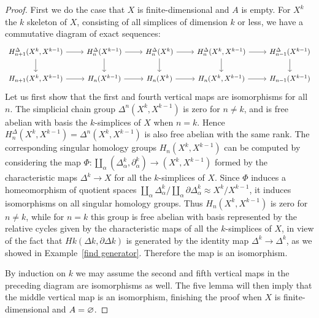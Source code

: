 \begin{proof}
First we do the case that $X$ is finite-dimensional and $A$ is empty. For $X^k$
the $k$ skeleton of $X$, consisting of all simplices of dimension $k$ or less, we have a commutative diagram of exact sequences:
\[\begin{tikzcd}
H_{n+1}^\Delta(X^k,X^{k-1})\ar[r]\ar[d]&H_n^{\Delta}(X^{k-1})\ar[r]\ar[d]&H_n^{\Delta}(X^{k})\ar[r]\ar[d]&H_n^{\Delta}(X^k,X^{k-1})\ar[r]\ar[d]&H_{n-1}^{\Delta}(X^{k-1})\ar[d]\\
H_{n+1}(X^k,X^{k-1})\ar[r]&H_n(X^{k-1})\ar[r]&H_n(X^{k})\ar[r]&H_n(X^k,X^{k-1})\ar[r]&H_{n-1}(X^{k-1})
\end{tikzcd}\]
Let us first show that the first and fourth vertical maps are isomorphisms for all $n$. The simplicial chain group $\Delta^n(X^k,X^{k-1})$ is zero for $n\neq k$, and is free abelian with basis the $k$-simplices of $X$ when $n=k$. Hence $H_n^\Delta(X^k,X^{k-1})=\Delta^n(X^k,X^{k-1})$ is also free abelian with the same rank. The corresponding singular homology groups $H_n(X^k,X^{k-1})$ can be computed by considering the map $\Phi:\coprod_\alpha(\Delta^k_\alpha,\partial^k_\alpha)\to(X^k,X^{k-1})$ formed by the characteristic maps $\Delta^k\to X$ for all the $k$-simplices of $X$. Since $\Phi$ induces a homeomorphism of quotient spaces $\coprod_\alpha \Delta^k_\alpha/\coprod_\alpha\partial\Delta^k_\alpha\approx X^k/X^{k-1}$, it induces isomorphisms on all singular homology groups. Thus $H_n(X^k,X^{k-1})$ is zero for $n\neq k$, while for $n=k$ this group is free abelian with basis represented by the relative cycles given by the characteristic maps of all the $k$-simplices of $X$, in view of the fact that $Hk(Δk, ∂Δk)$ is generated by the identity map $\Delta^k\to\Delta^k$, as we showed in Example~\ref{find generator}. Therefore the map  is an isomorphism.\par
By induction on $k$ we may assume the second and fifth vertical maps in the preceding diagram are isomorphisms as well. The five lemma will then imply that the middle vertical map is an isomorphism, finishing the proof when $X$ is finite-dimensional and $A=\varnothing$.\par

\end{proof}
